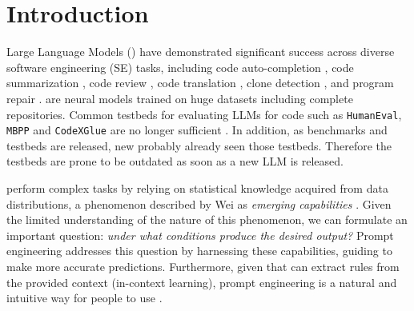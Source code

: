 \section{Introduction}\label{sec:introduction}

Large Language Models (\llms) have demonstrated significant success across diverse software engineering (SE) tasks, including code auto-completion \cite{austin2021program, Hendrycks2021apps, chen_generation_2021,White.MSR.2015,Ciniselli.TSE}, code summarization \cite{leclair_ensemble_2021,Moran.SANER.2022}, code review \cite{Tufano.ICSE.2021, Tufano.ICSE.2022}, code translation \cite{Nguyen:ICSE15},  clone detection \cite{White.ASE2016,Tufano.MSR.2018}, and program repair \cite{Tufano2019LearningBugFixes,zhou_devign_nodate,SANER.2019,Tufano.ICSE19.Changes,ASE.2018,Zimin.Sequencer,CanWeFix}. \llms are neural models trained on huge datasets including complete \github repositories. Common testbeds for evaluating LLMs for code such as \texttt{HumanEval}, \texttt{MBPP} and \texttt{CodeXGlue} are no longer sufficient \cite{jain_livecodebench_2024}. In addition, as benchmarks and testbeds are released, new \llms probably already seen those testbeds. Therefore the testbeds are prone to be outdated as soon as a new LLM is released.



\llms perform complex tasks by relying on statistical knowledge acquired from data distributions, a phenomenon described by Wei \etal as \textit{emerging capabilities} \cite{wei_emergent_2022}.  Given the limited understanding of the nature of this phenomenon, we can formulate an important question: \textit{under what conditions \llms produce the desired output?} Prompt engineering addresses this question by harnessing these capabilities, guiding \llms to make more accurate predictions. Furthermore, given that \llms can extract rules from the provided context (\ie in-context learning), prompt engineering is a natural and intuitive way for people to use \llms.


